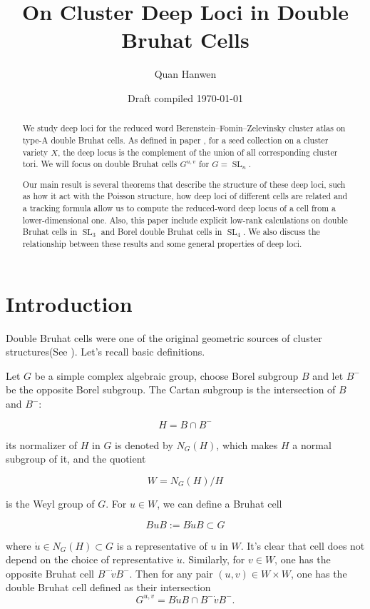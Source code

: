 \documentclass[12pt]{amsart}
\title[On Cluster deep loci in double Bruhat cells]{On Cluster Deep Loci in Double Bruhat Cells}
\author{Quan Hanwen}
\date{Draft compiled \today}
\newcommand{\SL}{\operatorname{SL}}
\theoremstyle{plain}
\theoremstyle{definition}
\theoremstyle{remark}
\begin{document}
\begin{abstract}
We study deep loci for the reduced word Berenstein--Fomin--Zelevinsky cluster atlas on type-A double Bruhat cells. As defined in paper \cite{CGSS24}, for a seed collection on a cluster variety $X$, the deep locus is the complement of the union of all corresponding cluster tori. We will focus on double Bruhat cells $G^{u,v}$ for $G=\SL_n$. 

Our main result is several theorems that describe the structure of these deep loci, such as how it act with the Poisson structure, how deep loci of different cells are related and a tracking formula allow us to compute the reduced-word deep locus of a cell from a lower-dimensional one. Also, this paper include explicit low-rank calculations on double Bruhat cells in $\SL_3$ and Borel double Bruhat cells in $\SL_4$. We also discuss the relationship between these results and some general properties of deep loci. 
\end{abstract}

\maketitle
\tableofcontents

\section{Introduction}

Double Bruhat cells were one of the original geometric sources of cluster structures(See \cite{FZ99}).  Let's recall basic definitions.

Let $G$ be a simple complex algebraic group, choose Borel subgroup $B$ and let $B^-$ be the opposite Borel subgroup. The Cartan subgroup is the intersection of $B$ and $B^-$:

$$H=B\cap B^-$$

its normalizer of $H$ in $G$ is denoted by $N_G(H)$, which makes $H$ a normal subgroup of it, and the quotient 

$$W=N_G(H)/H$$

is the Weyl group of $G$. For $u\in W$, we can define a Bruhat cell 

$$BuB:= B\dot{u}B\subset G$$

where $\dot{u}\in N_G(H) \subset G$ is a representative of $u$ in $W$. It's clear that cell does not depend on the choice of representative $\dot{u}$.  Similarly, for $v\in W$, one has the opposite Bruhat cell $B^-\dot{v}B^-$.  Then for any pair $(u,v)\in W\times W$, one has the double Bruhat cell defined as their intersection
\[
   G^{u,v}=B\dot{u}B\cap B^-\dot{v}B^- .
\]
\end{document}
